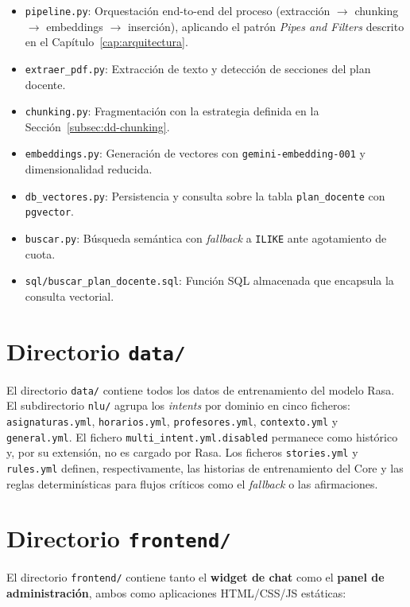\begin{itemize}
    \item \texttt{pipeline.py}: Orquestación end-to-end del proceso (extracción $\rightarrow$ chunking $\rightarrow$ embeddings $\rightarrow$ inserción), aplicando el patrón \textit{Pipes and Filters} descrito en el Capítulo~\ref{cap:arquitectura}.
    \item \texttt{extraer\_pdf.py}: Extracción de texto y detección de secciones del plan docente.
    \item \texttt{chunking.py}: Fragmentación con la estrategia definida en la Sección~\ref{subsec:dd-chunking}.
    \item \texttt{embeddings.py}: Generación de vectores con \texttt{gemini-embedding-001} y dimensionalidad reducida.
    \item \texttt{db\_vectores.py}: Persistencia y consulta sobre la tabla \texttt{plan\_docente} con \texttt{pgvector}.
    \item \texttt{buscar.py}: Búsqueda semántica con \textit{fallback} a \texttt{ILIKE} ante agotamiento de cuota.
    \item \texttt{sql/buscar\_plan\_docente.sql}: Función SQL almacenada que encapsula la consulta vectorial.
\end{itemize}

\section{Directorio \texttt{data/}}\label{sec:data}

El directorio \texttt{data/} contiene todos los datos de entrenamiento del modelo Rasa. El subdirectorio \texttt{nlu/} agrupa los \textit{intents} por dominio en cinco ficheros: \texttt{asignaturas.yml}, \texttt{horarios.yml}, \texttt{profesores.yml}, \texttt{contexto.yml} y \texttt{general.yml}. El fichero \texttt{multi\_intent.yml.disabled} permanece como histórico y, por su extensión, no es cargado por Rasa. Los ficheros \texttt{stories.yml} y \texttt{rules.yml} definen, respectivamente, las historias de entrenamiento del Core y las reglas determinísticas para flujos críticos como el \textit{fallback} o las afirmaciones.

\section{Directorio \texttt{frontend/}}\label{sec:frontend-estructura}

El directorio \texttt{frontend/} contiene tanto el \textbf{widget de chat} como el \textbf{panel de administración}, ambos como aplicaciones HTML/CSS/JS estáticas:

